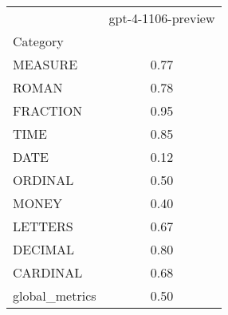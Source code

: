 \begin{table}
\centering
\begin{tabular}{lc}
\toprule
 & gpt-4-1106-preview \\
Category &  \\
\midrule
MEASURE & 0.77 \\
ROMAN & 0.78 \\
FRACTION & 0.95 \\
TIME & 0.85 \\
DATE & 0.12 \\
ORDINAL & 0.50 \\
MONEY & 0.40 \\
LETTERS & 0.67 \\
DECIMAL & 0.80 \\
CARDINAL & 0.68 \\
global_metrics & 0.50 \\
\bottomrule
\end{tabular}
\end{table}
